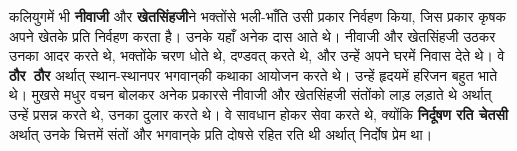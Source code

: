 \begin{sloppypar}\justifying{}
कलियुगमें भी \textbf{नीवाजी} और \textbf{खेतसिंहजी}ने भक्तोंसे भली-भाँति उसी प्रकार निर्वहण किया, जिस प्रकार कृषक अपने खेतके प्रति निर्वहण करता है। उनके यहाँ अनेक दास आते थे। नीवाजी और खेतसिंहजी उठकर उनका आदर करते थे, भक्तोंके चरण धोते थे, दण्डवत् करते थे, और उन्हें अपने घरमें निवास देते थे। वे \textbf{ठौर~ठौर} अर्थात् स्थान-स्थानपर भगवान्‌की कथाका आयोजन करते थे। उन्हें हृदयमें हरिजन बहुत भाते थे। मुखसे मधुर वचन बोलकर अनेक प्रकारसे नीवाजी और खेतसिंहजी संतोंको लाड़ लड़ाते थे अर्थात् उन्हें प्रसन्न करते थे, उनका दुलार करते थे। वे सावधान होकर सेवा करते थे, क्योंकि \textbf{निर्दूषण रति चेतसी} अर्थात् उनके चित्तमें संतों और भगवान्‌के प्रति दोषसे रहित रति थी अर्थात् निर्दोष प्रेम था।
\end{sloppypar}


